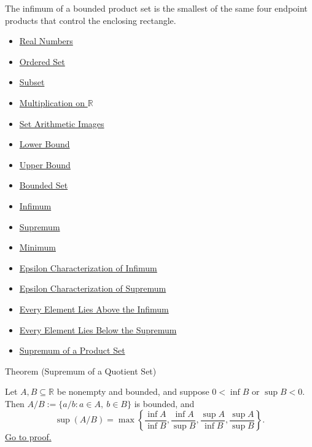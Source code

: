 \begin{remark*}[Interpretation]
The infimum of a bounded product set is the smallest of the same four endpoint
products that control the enclosing rectangle.
\end{remark*}

\begin{dependencies}
\begin{itemize}
  \item \hyperref[def:reals]{Real Numbers}
  \item \hyperref[def:ordered-set]{Ordered Set}
  \item \hyperref[def:subset]{Subset}
  \item \hyperref[def:multiplication-on-r]{Multiplication on $\mathbb{R}$}
  \item \hyperref[def:set-arithmetic-images]{Set Arithmetic Images}
  \item \hyperref[def:real-lower-bound]{Lower Bound}
  \item \hyperref[def:real-upper-bound]{Upper Bound}
  \item \hyperref[def:bounded]{Bounded Set}
  \item \hyperref[def:infimum]{Infimum}
  \item \hyperref[def:supremum]{Supremum}
  \item \hyperref[def:minimum]{Minimum}
  \item \hyperref[def:epsilon-characterization-of-infimum]{Epsilon Characterization of Infimum}
  \item \hyperref[def:epsilon-characterization-of-supremum]{Epsilon Characterization of Supremum}
  \item \hyperref[prop:every-element-lies-above-the-infimum]{Every Element Lies Above the Infimum}
  \item \hyperref[prop:every-element-lies-below-the-supremum]{Every Element Lies Below the Supremum}
  \item \hyperref[thm:supremum-product-set]{Supremum of a Product Set}
\end{itemize}
\end{dependencies}

\begin{theorembox}{Theorem (Supremum of a Quotient Set)}
\begin{theorem}
\label{thm:supremum-quotient-set}
Let $A,B\subseteq\mathbb{R}$ be nonempty and bounded, and suppose
$0<\inf B$ or $\sup B<0$.  Then
$A/B:=\{a/b:a\in A,\ b\in B\}$ is bounded, and
\[
  \sup(A/B)=
  \max\left\{\frac{\inf A}{\inf B},\frac{\inf A}{\sup B},
              \frac{\sup A}{\inf B},\frac{\sup A}{\sup B}\right\}.
\]
\hyperref[prf:supremum-quotient-set]{Go to proof.}
\end{theorem}
\end{theorembox}

